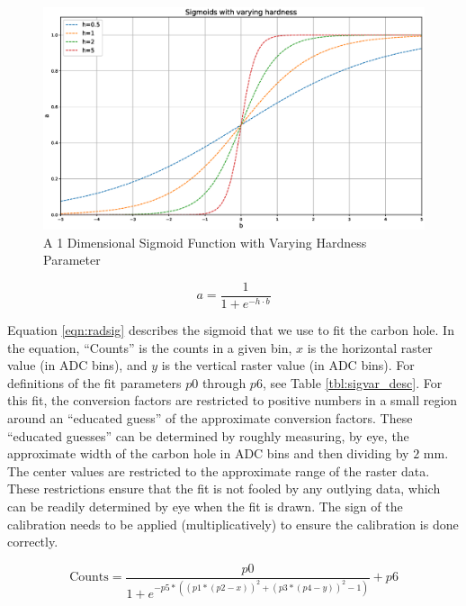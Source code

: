 \begin{figure}
\begin{center}
	\includegraphics[width=\textwidth]{./app1/figures/sig_hard.eps}
	\caption{A 1 Dimensional Sigmoid Function with Varying Hardness Parameter}
	\label{fig:sighard}
\end{center}
\end{figure}

\begin{equation}
	a = \frac{1}{1 + e^{-h\cdot b}}
	\label{eqn:base_sig}
\end{equation}


Equation \ref{eqn:radsig} describes the sigmoid that we use to fit the carbon hole. In the equation, ``Counts'' is the counts in a given bin, $x$ is the horizontal raster value (in ADC bins), and $y$ is the vertical raster value (in ADC bins). For definitions of the fit parameters $p0$ through $p6$, see Table \ref{tbl:sigvar_desc}. For this fit, the conversion factors are restricted to positive numbers in a small region around an ``educated guess'' of the approximate conversion factors. These ``educated guesses'' can be determined by roughly measuring, by eye, the approximate width of the carbon hole in ADC bins and then dividing by $2$ mm. The center values are restricted to the approximate range of the raster data. These restrictions ensure that the fit is not fooled by any outlying data, which can be readily determined by eye when the fit is drawn. The sign of the calibration needs to be applied (multiplicatively) to ensure the calibration is done correctly.

\begin{equation}
\mathrm{Counts} = \frac{p0}{1+e^{-p5*\left(\left(p1*\left(p2-x\right)\right)^{2}+\left(p3*\left(p4-y\right)\right)^{2}-1\right)}}+p6
\label{eqn:radsig}
\end{equation}

